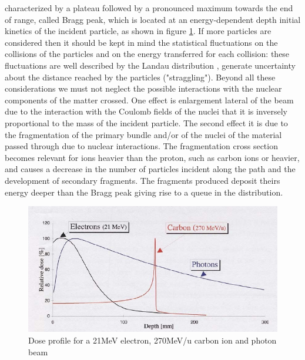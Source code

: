 characterized by a plateau followed by a pronounced maximum towards the end of range, called Bragg peak, which is located at an energy-dependent depth initial kinetics of the incident particle, as shown in figure \ref{fig:braggpeak}.
If more particles are considered then it should be kept in mind
the statistical fluctuations on the collisions of the particles and on the energy transferred for each collision: these fluctuations are well described by the Landau distribution \cite{landau}
, generate uncertainty about the distance reached by the particles ("straggling"). Beyond all these considerations we must not neglect the possible interactions with the nuclear components of the matter crossed. One effect is enlargement
lateral of the beam due to the interaction with the Coulomb fields of the nuclei that it is inversely proportional to the mass of the incident particle. The second effect it is due to the fragmentation of the primary bundle and/or of the nuclei of the material passed through due to nuclear interactions. The fragmentation cross section becomes relevant for ions heavier than the proton, such as carbon ions or heavier, and causes a decrease in the number of particles incident along the path
and the development of secondary fragments. The fragments produced deposit theirs energy deeper than the Bragg peak giving rise to a queue in the distribution.
\begin{figure}[H]
	\centering
	\includegraphics[width=0.7\linewidth]{IMG/ch1/BraggPeak}
	\caption{Dose profile for a 21MeV electron, 270MeV/u carbon ion and photon beam}
	\label{fig:braggpeak}
\end{figure}  



